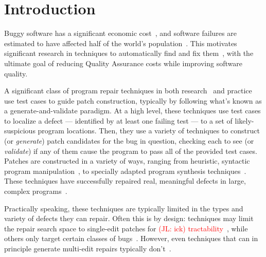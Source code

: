 \documentclass[sigconf, timestamp-false, anonymous=true]{acmart}
\newcommand\todo[1]{\textcolor{red}{#1}}
\begin{document}

\maketitle


\newcommand{\rqorinsight}[2]{
  \setlength{\fboxsep}{0.8em}
  \vspace{0.5em}
  \begin{center}
  \Ovalbox{\begin{minipage}{0.9\linewidth}
    \textbf{Research Question:} #1
    \end{minipage}}
  \end{center}
  \vspace{0.5em}}

\section{Introduction}

Buggy software has a significant economic cost~\cite{cambridge-study}, and
software failures are estimated to have affected half of the world's
population~\cite{tricentis}. This motivates significant research in techniques
to automatically find and fix them~\cite{whatever}, with the ultimate goal of
reducing Quality Assurance costs while improving software quality.

A significant class of program repair techniques in both
research~\cite{genprog,angelix,Le17, Xuan17} and practice~\cite{sapfix} use test cases to guide
patch construction, typically by following what's known as a
generate-and-validate paradigm. At a high level, these techniques use test cases
to localize a defect --- identified by at least one failing test --- to a set of
likely-suspicious program locations. Then, they use a variety of techniques to
construct (or \emph{generate}) patch candidates for the bug in question,
checking each to see (or \emph{validate}) if any of them cause the program to
pass all of the provided test cases.  
%
Patches are constructed in a variety of ways, ranging from heuristic, syntactic
program manipulation~\cite{par,genprog,rsrepair,ae,prophet,hdrepair}, to specially adapted program
synthesis techniques~\cite{Konighofer11,Konighofer12,semfix,DeMarco14,angelix}. These techniques have successfully
repaired real, meaningful defects in large, complex
programs~\cite{angelix,genprog-eight-dollars,prophet,sapfix}.

Practically speaking, these techniques are typically limited in the types and
variety of defects they can repair. Often this is by design: techniques may
limit the repair search space to single-edit patches for \todo{(JL: ick)
  tractability}~\cite{rsrepair,ae,hdrepair}, while others only target certain
classes of bugs~\cite{Xuan17,sapfix,DeMarco14,par}. However, even techniques
that can in principle generate multi-edit repairs typically
don't~\cite{genprog,others}.
\end{document}
